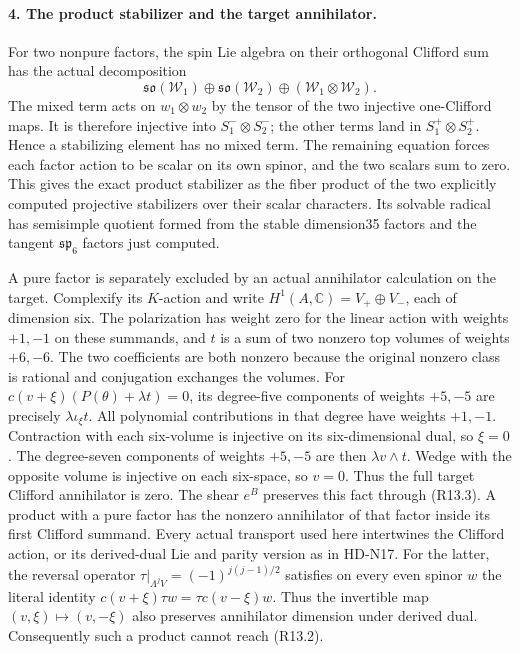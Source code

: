\paragraph{4. The product stabilizer and the target annihilator.}
For two nonpure factors, the spin Lie algebra on their
orthogonal Clifford sum has the actual decomposition
\[
 \mathfrak{so}(\mathcal W_1)\oplus
 \mathfrak{so}(\mathcal W_2)\oplus
                         (\mathcal W_1\otimes\mathcal W_2).
                                                               \tag{R13.12}
\]
The mixed term acts on \(w_1\otimes w_2\) by the tensor
of the two injective one-Clifford maps. It is therefore
injective into \(S_1^-\otimes S_2^-\); the other terms
land in \(S_1^+\otimes S_2^+\). Hence a stabilizing
element has no mixed term. The remaining equation forces
each factor action to be scalar on its own spinor, and the
two scalars sum to zero. This gives the exact product
stabilizer as the fiber product of the two explicitly
computed projective stabilizers over their scalar characters.
Its solvable radical has semisimple quotient formed from
the stable dimension35 factors and the tangent
\(\mathfrak{sp}_6\) factors just computed.

A pure factor is separately excluded by an actual annihilator
calculation on the target. Complexify its \(K\)-action and
write \(H^1(A,\mathbb C)=V_+\oplus V_-\), each of
dimension six. The polarization has weight zero for the
linear action with weights \(+1,-1\) on these summands,
and \(t\) is a sum of two nonzero top volumes of weights
\(+6,-6\). The two coefficients are both nonzero because
the original nonzero class is rational and conjugation exchanges
the volumes. For
\(c(v+\xi)(P(\theta)+\lambda t)=0\), its degree-five
components of weights \(+5,-5\) are precisely
\(\lambda\iota_\xi t\). All polynomial contributions
in that degree have weights \(+1,-1\). Contraction with
each six-volume is injective on its six-dimensional dual,
so \(\xi=0\). The degree-seven components of weights
\(+5,-5\) are then \(\lambda v\wedge t\). Wedge with
the opposite volume is injective on each six-space, so
\(v=0\). Thus the full target Clifford annihilator is
zero. The shear \(e^B\) preserves this fact through
(R13.3). A product with a pure factor has the nonzero
annihilator of that factor inside its first Clifford summand.
Every actual transport used here intertwines the Clifford
action, or its derived-dual Lie and parity version as in
HD-N17. For the latter, the reversal operator
\(\tau|_{\Lambda^jV}=(-1)^{j(j-1)/2}\) satisfies on
every even spinor \(w\) the literal identity
\(c(v+\xi)\tau w=\tau c(v-\xi)w\).
Thus the invertible map \((v,\xi)\mapsto(v,-\xi)\)
also preserves annihilator dimension under derived dual.
Consequently such a product cannot reach (R13.2).

